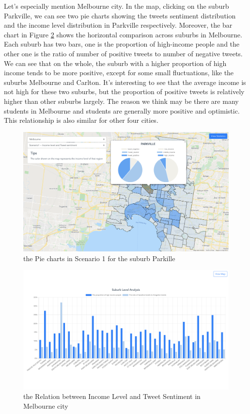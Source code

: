 \documentclass{article}
\begin{document}
Let’s especially mention Melbourne city. In the map, clicking on the suburb Parkville, we can see two pie charts showing the tweets sentiment distribution and the income level  distribution in Parkville respectively. Moreover, the bar chart in Figure 
\ref{fig:Melbourne_histogram} shows the horizontal comparison across suburbs in Melbourne. Each suburb has two bars, one is the proportion of high-income people and the other one is the ratio of number of positive tweets to number of negative tweets. We can see that on the whole, the suburb with a higher proportion of high income tends to be more positive, except for some small fluctuations, like the suburbs Melbourne and Carlton. It's interesting to see that the average income is not high for these two suburbs, but the proportion of positive tweets is relatively higher than other suburbs largely. The reason we think may be there are many students in Melbourne and students are generally more positive and optimistic. This relationship is also similar for other four cities.

\begin{figure}[htp]
\centering
\includegraphics[width=\textwidth]{img/Melbourne_pie_chart.png}
\caption{the Pie charts in Scenario 1 for the suburb Parkille}
\label{fig:Melbourne_pie_chart}
\end{figure}

\begin{figure}[htp]
\centering
\includegraphics[width=\textwidth]{img/Melbourne_histogram.png}
\caption{the Relation between Income Level and Tweet Sentiment in Melbourne city}
\label{fig:Melbourne_histogram}
\end{figure}
\end{document}
